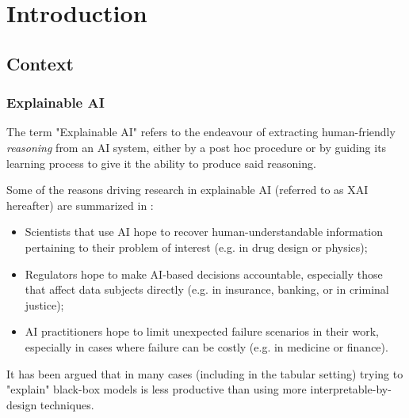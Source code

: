 \documentclass[../main.tex]{subfiles}
\begin{document}
\chapter{Introduction}
\label{ch:introduction}


\section{Context}

\subsection{Explainable AI}

The term "Explainable AI" refers to the endeavour of extracting human-friendly \emph{reasoning} from an AI system, either by a post hoc procedure or by guiding its learning process to give it the ability to produce said reasoning\citenote{}.

Some of the reasons driving research in explainable AI (referred to as XAI hereafter) are summarized in \cite{zhangSurvey2021}:
\begin{itemize}
    \item Scientists that use AI hope to recover human-understandable information pertaining to their problem of interest (e.g. in drug design or physics);
    \item Regulators hope to make AI-based decisions accountable, especially those that affect data subjects directly (e.g. in insurance, banking, or in criminal justice);
    \item AI practitioners hope to limit unexpected failure scenarios in their work, especially in cases where failure can be costly (e.g. in medicine or finance).
\end{itemize}

It has been argued \cite{rudinWhy2019} that in many cases (including in the tabular setting) trying to "explain" black-box models is less productive than using more interpretable-by-design techniques.
\end{document}
